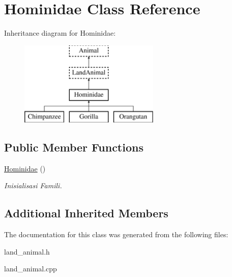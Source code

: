 \hypertarget{class_hominidae}{}\section{Hominidae Class Reference}
\label{class_hominidae}
Inheritance diagram for Hominidae\+:\begin{figure}[H]
\begin{center}
\leavevmode
\includegraphics[height=4.000000cm]{class_hominidae}
\end{center}
\end{figure}
\subsection*{Public Member Functions}
\begin{DoxyCompactItemize}
\item 
\hyperlink{class_hominidae_a69eac36a3a1bfec4ee6f855f5627224b}{Hominidae} ()\hypertarget{class_hominidae_a69eac36a3a1bfec4ee6f855f5627224b}{}\label{class_hominidae_a69eac36a3a1bfec4ee6f855f5627224b}

\begin{DoxyCompactList}\small\item\em Inisialisasi Famili. \end{DoxyCompactList}\end{DoxyCompactItemize}
\subsection*{Additional Inherited Members}


The documentation for this class was generated from the following files\+:\begin{DoxyCompactItemize}
\item 
land\+\_\+animal.\+h\item 
land\+\_\+animal.\+cpp\end{DoxyCompactItemize}
